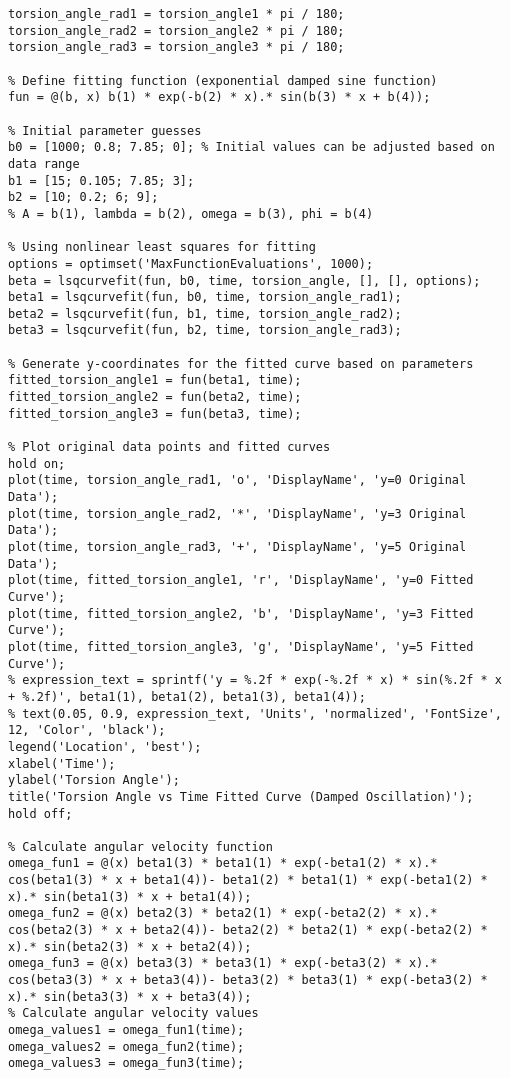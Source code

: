 \documentclass{mcmthesis}  %
\begin{document}
\begin{appendices}
\begin{verbatim}
torsion_angle_rad1 = torsion_angle1 * pi / 180;
torsion_angle_rad2 = torsion_angle2 * pi / 180;
torsion_angle_rad3 = torsion_angle3 * pi / 180;

% Define fitting function (exponential damped sine function)
fun = @(b, x) b(1) * exp(-b(2) * x).* sin(b(3) * x + b(4));

% Initial parameter guesses
b0 = [1000; 0.8; 7.85; 0]; % Initial values can be adjusted based on data range
b1 = [15; 0.105; 7.85; 3];
b2 = [10; 0.2; 6; 9];
% A = b(1), lambda = b(2), omega = b(3), phi = b(4)

% Using nonlinear least squares for fitting
options = optimset('MaxFunctionEvaluations', 1000);
beta = lsqcurvefit(fun, b0, time, torsion_angle, [], [], options);
beta1 = lsqcurvefit(fun, b0, time, torsion_angle_rad1);
beta2 = lsqcurvefit(fun, b1, time, torsion_angle_rad2);
beta3 = lsqcurvefit(fun, b2, time, torsion_angle_rad3);

% Generate y-coordinates for the fitted curve based on parameters
fitted_torsion_angle1 = fun(beta1, time);
fitted_torsion_angle2 = fun(beta2, time);
fitted_torsion_angle3 = fun(beta3, time);

% Plot original data points and fitted curves
hold on;
plot(time, torsion_angle_rad1, 'o', 'DisplayName', 'y=0 Original Data');
plot(time, torsion_angle_rad2, '*', 'DisplayName', 'y=3 Original Data');
plot(time, torsion_angle_rad3, '+', 'DisplayName', 'y=5 Original Data');
plot(time, fitted_torsion_angle1, 'r', 'DisplayName', 'y=0 Fitted Curve');
plot(time, fitted_torsion_angle2, 'b', 'DisplayName', 'y=3 Fitted Curve');
plot(time, fitted_torsion_angle3, 'g', 'DisplayName', 'y=5 Fitted Curve');
% expression_text = sprintf('y = %.2f * exp(-%.2f * x) * sin(%.2f * x + %.2f)', beta1(1), beta1(2), beta1(3), beta1(4));
% text(0.05, 0.9, expression_text, 'Units', 'normalized', 'FontSize', 12, 'Color', 'black');
legend('Location', 'best');
xlabel('Time');
ylabel('Torsion Angle');
title('Torsion Angle vs Time Fitted Curve (Damped Oscillation)');
hold off;

% Calculate angular velocity function
omega_fun1 = @(x) beta1(3) * beta1(1) * exp(-beta1(2) * x).* cos(beta1(3) * x + beta1(4))- beta1(2) * beta1(1) * exp(-beta1(2) * x).* sin(beta1(3) * x + beta1(4));
omega_fun2 = @(x) beta2(3) * beta2(1) * exp(-beta2(2) * x).* cos(beta2(3) * x + beta2(4))- beta2(2) * beta2(1) * exp(-beta2(2) * x).* sin(beta2(3) * x + beta2(4));
omega_fun3 = @(x) beta3(3) * beta3(1) * exp(-beta3(2) * x).* cos(beta3(3) * x + beta3(4))- beta3(2) * beta3(1) * exp(-beta3(2) * x).* sin(beta3(3) * x + beta3(4));
% Calculate angular velocity values
omega_values1 = omega_fun1(time);
omega_values2 = omega_fun2(time);
omega_values3 = omega_fun3(time);


\end{verbatim}
\end{appendices}
\end{document}
